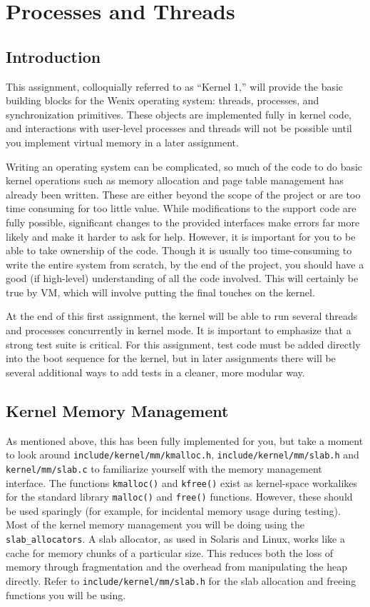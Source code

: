 \chapter{Processes and Threads}
\label{kern1}

\section{Introduction}

This assignment, colloquially referred to as ``Kernel 1,'' will provide the basic building blocks for the Wenix operating system: threads, processes, and synchronization primitives. These objects are implemented fully in kernel code, and interactions with user-level processes and threads will not be possible until you implement virtual memory in a later assignment.

Writing an operating system can be complicated, so much of the code to do basic kernel operations such as memory allocation and page table management has already been written. These are either beyond the scope of the project or are too time consuming for too little value. While modifications to the support code are fully possible, significant changes to the provided interfaces make errors far more likely and make it harder to ask for help. However, it is important for you to be able to take ownership of the code. Though it is usually too time-consuming to write the entire system from scratch, by the end of the project, you should have a good (if high-level) understanding of all the code involved. This will certainly be true by VM, which will involve putting the final touches on the kernel.

At the end of this first assignment, the kernel will be able to run several threads and processes concurrently in kernel mode. It is important to emphasize that a strong test suite is critical. For this assignment, test code must be added directly into the boot sequence for the kernel, but in later assignments there will be several additional ways to add tests in a cleaner, more modular way.

\section{Kernel Memory Management}

As mentioned above, this has been fully implemented for you, but take a moment to look around \texttt{include/kernel/mm/kmalloc.h}, \texttt{include/kernel/mm/slab.h} and \texttt{kernel/mm/slab.c} to familiarize yourself with the memory management interface. The functions \texttt{kmalloc()} and \texttt{kfree()} exist as kernel-space workalikes for the standard library \texttt{malloc()} and \texttt{free()} functions. However, these should be used sparingly (for example, for incidental memory usage during testing). Most of the kernel memory management you will be doing using the \texttt{slab\_allocators}. A slab allocator, as used in Solaris and Linux, works like a cache for memory chunks of a particular size. This reduces both the loss of memory through fragmentation and the overhead from manipulating the heap directly. Refer to \texttt{include/kernel/mm/slab.h} for the slab allocation and freeing functions you will be using.

